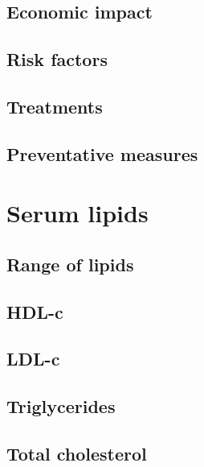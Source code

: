 \documentclass[a4paper, nobind]{templates/ociamthesis}
\begin{document}
\hypertarget{economic-impact}{%
\subsection{Economic impact}\label{economic-impact}}

\hypertarget{risk-factors}{%
\subsection{Risk factors}\label{risk-factors}}

\hypertarget{treatments}{%
\subsection{Treatments}\label{treatments}}

\hypertarget{preventative-measures}{%
\subsection{Preventative measures}\label{preventative-measures}}

\hypertarget{serum-lipids}{%
\section{Serum lipids}\label{serum-lipids}}

\hypertarget{range-of-lipids}{%
\subsection{Range of lipids}\label{range-of-lipids}}

\hypertarget{hdl-c}{%
\subsection{HDL-c}\label{hdl-c}}

\hypertarget{ldl-c}{%
\subsection{LDL-c}\label{ldl-c}}

\hypertarget{triglycerides}{%
\subsection{Triglycerides}\label{triglycerides}}

\hypertarget{total-cholesterol}{%
\subsection{Total cholesterol}\label{total-cholesterol}}
\end{document}

